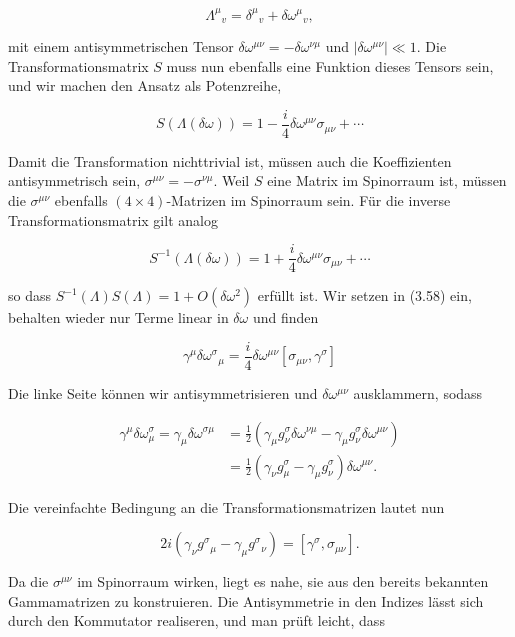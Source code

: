 \documentclass[10pt, letterpaper]{article}
\begin{document}
$$
\Lambda^{\mu}{ }_{v}=\delta^{\mu}{ }_{v}+\delta \omega^{\mu}{ }_{v},
$$

mit einem antisymmetrischen Tensor $\delta \omega^{\mu \nu}=-\delta \omega^{\nu \mu}$ und $\left|\delta \omega^{\mu \nu}\right| \ll 1$. Die Transformationsmatrix $S$ muss nun ebenfalls eine Funktion dieses Tensors sein, und wir machen den Ansatz als Potenzreihe,

$$
S(\Lambda(\delta \omega))=1-\frac{i}{4} \delta \omega^{\mu \nu} \sigma_{\mu \nu}+\cdots
$$

Damit die Transformation nichttrivial ist, müssen auch die Koeffizienten antisymmetrisch sein, $\sigma^{\mu \nu}=-\sigma^{\nu \mu}$. Weil $S$ eine Matrix im Spinorraum ist, müssen die $\sigma^{\mu \nu}$ ebenfalls $(4 \times 4)$-Matrizen im Spinorraum sein. Für die inverse Transformationsmatrix gilt analog

$$
S^{-1}(\Lambda(\delta \omega))=1+\frac{i}{4} \delta \omega^{\mu \nu} \sigma_{\mu \nu}+\cdots
$$

so dass $S^{-1}(\Lambda) S(\Lambda)=1+O\left(\delta \omega^{2}\right)$ erfüllt ist. Wir setzen in (3.58) ein, behalten wieder nur Terme linear in $\delta \omega$ und finden

$$
\gamma^{\mu} \delta \omega^{\sigma}{ }_{\mu}=\frac{i}{4} \delta \omega^{\mu \nu}\left[\sigma_{\mu \nu}, \gamma^{\sigma}\right]
$$

Die linke Seite können wir antisymmetrisieren und $\delta \omega^{\mu \nu}$ ausklammern, sodass

$$
\begin{aligned}
\gamma^{\mu} \delta \omega_{\mu}^{\sigma}=\gamma_{\mu} \delta \omega^{\sigma \mu} & =\frac{1}{2}\left(\gamma_{\mu} g_{\nu}^{\sigma} \delta \omega^{\nu \mu}-\gamma_{\mu} g_{\nu}^{\sigma} \delta \omega^{\mu \nu}\right) \\
& =\frac{1}{2}\left(\gamma_{\nu} g_{\mu}^{\sigma}-\gamma_{\mu} g_{\nu}^{\sigma}\right) \delta \omega^{\mu \nu} .
\end{aligned}
$$

Die vereinfachte Bedingung an die Transformationsmatrizen lautet nun

$$
2 i\left(\gamma_{\nu} g^{\sigma}{ }_{\mu}-\gamma_{\mu} g^{\sigma}{ }_{\nu}\right)=\left[\gamma^{\sigma}, \sigma_{\mu \nu}\right] .
$$

Da die $\sigma^{\mu \nu}$ im Spinorraum wirken, liegt es nahe, sie aus den bereits bekannten Gammamatrizen zu konstruieren. Die Antisymmetrie in den Indizes lässt sich durch den Kommutator realiseren, und man prüft leicht, dass
\end{document}
